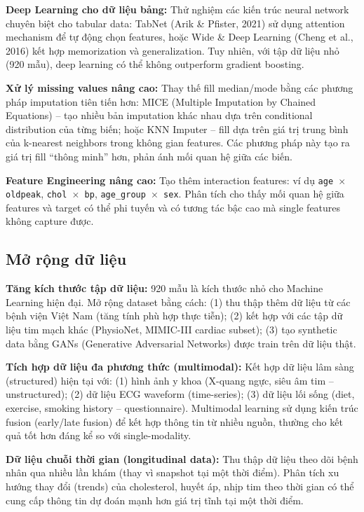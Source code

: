 \textbf{Deep Learning cho dữ liệu bảng:} Thử nghiệm các kiến trúc neural network chuyên biệt cho tabular data: TabNet (Arik \& Pfister, 2021) sử dụng attention mechanism để tự động chọn features, hoặc Wide \& Deep Learning (Cheng et al., 2016) kết hợp memorization và generalization. Tuy nhiên, với tập dữ liệu nhỏ (920 mẫu), deep learning có thể không outperform gradient boosting.

\textbf{Xử lý missing values nâng cao:} Thay thế fill median/mode bằng các phương pháp imputation tiên tiến hơn: MICE (Multiple Imputation by Chained Equations) -- tạo nhiều bản imputation khác nhau dựa trên conditional distribution của từng biến; hoặc KNN Imputer -- fill dựa trên giá trị trung bình của k-nearest neighbors trong không gian features. Các phương pháp này tạo ra giá trị fill ``thông minh'' hơn, phản ánh mối quan hệ giữa các biến.

\textbf{Feature Engineering nâng cao:} Tạo thêm interaction features: ví dụ \texttt{age $\times$ oldpeak}, \texttt{chol $\times$ bp}, \texttt{age\_group $\times$ sex}. Phân tích cho thấy mối quan hệ giữa features và target có thể phi tuyến và có tương tác bậc cao mà single features không capture được.

\subsection{Mở rộng dữ liệu}

\textbf{Tăng kích thước tập dữ liệu:} 920 mẫu là kích thước nhỏ cho Machine Learning hiện đại. Mở rộng dataset bằng cách: (1) thu thập thêm dữ liệu từ các bệnh viện Việt Nam (tăng tính phù hợp thực tiễn); (2) kết hợp với các tập dữ liệu tim mạch khác (PhysioNet, MIMIC-III cardiac subset); (3) tạo synthetic data bằng GANs (Generative Adversarial Networks) được train trên dữ liệu thật.

\textbf{Tích hợp dữ liệu đa phương thức (multimodal):} Kết hợp dữ liệu lâm sàng (structured) hiện tại với: (1) hình ảnh y khoa (X-quang ngực, siêu âm tim -- unstructured); (2) dữ liệu ECG waveform (time-series); (3) dữ liệu lối sống (diet, exercise, smoking history -- questionnaire). Multimodal learning sử dụng kiến trúc fusion (early/late fusion) để kết hợp thông tin từ nhiều nguồn, thường cho kết quả tốt hơn đáng kể so với single-modality.

\textbf{Dữ liệu chuỗi thời gian (longitudinal data):} Thu thập dữ liệu theo dõi bệnh nhân qua nhiều lần khám (thay vì snapshot tại một thời điểm). Phân tích xu hướng thay đổi (trends) của cholesterol, huyết áp, nhịp tim theo thời gian có thể cung cấp thông tin dự đoán mạnh hơn giá trị tĩnh tại một thời điểm.

